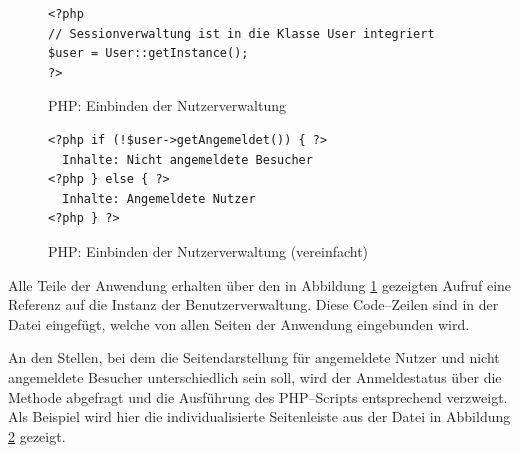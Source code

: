 \begin{figure}[h]
\begin{spacing}{1.0}
\begin{verbatim}
<?php
// Sessionverwaltung ist in die Klasse User integriert
$user = User::getInstance(); 
?>
\end{verbatim}
\caption{PHP: Einbinden der Nutzerverwaltung}
\label{php:getinstance}
\end{spacing}
\end{figure}

\begin{figure}[h]
\begin{spacing}{1.0}
\begin{verbatim}
<?php if (!$user->getAngemeldet()) { ?>
  Inhalte: Nicht angemeldete Besucher
<?php } else { ?>
  Inhalte: Angemeldete Nutzer
<?php } ?>
\end{verbatim}
\caption{PHP: Einbinden der Nutzerverwaltung (vereinfacht)}
\label{php:angemeldet}
\end{spacing}
\end{figure}

Alle Teile der Anwendung erhalten über den in Abbildung \ref{php:getinstance} gezeigten Aufruf eine Referenz auf die Instanz der Benutzerverwaltung. Diese Code--Zeilen sind in der Datei  eingefügt, welche von allen Seiten der Anwendung eingebunden wird.

An den Stellen, bei dem die Seitendarstellung für angemeldete Nutzer und nicht angemeldete Besucher unterschiedlich sein soll, wird der Anmeldestatus über die Methode  abgefragt und die Ausführung des PHP--Scripts entsprechend verzweigt. Als Beispiel wird hier die individualisierte Seitenleiste aus der Datei  in Abbildung \ref{php:angemeldet} gezeigt.

 